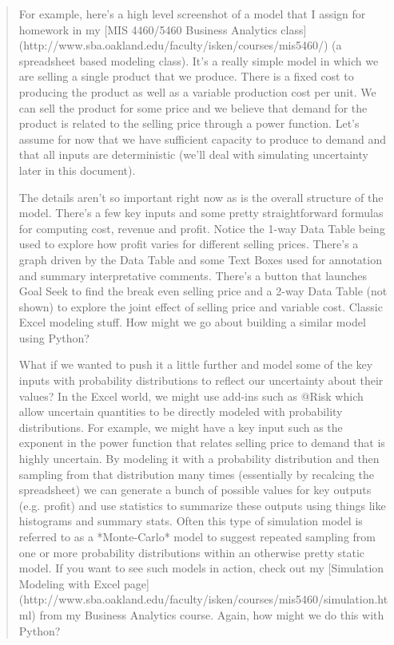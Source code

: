 \documentclass[ited,blindrev]{informs3}              %
\begin{document}
\begin{quote}
	For example, here's a high level screenshot of a model that I assign for homework in my [MIS 4460/5460 Business Analytics class](http://www.sba.oakland.edu/faculty/isken/courses/mis5460/) (a spreadsheet based modeling class).
	It's a really simple model in which we are selling a single product that we produce. There is a fixed cost to producing the product as well as a variable production cost per unit. We can sell the product for some price and we believe that demand for the product is related to the selling price through a power function. Let's assume for now that we have sufficient capacity to produce to demand and that all inputs are deterministic (we'll deal with simulating uncertainty later in this document).
	
	The details aren't so important right now as is the overall structure of the model. There's a few key inputs and some pretty straightforward formulas for computing cost, revenue and profit. Notice the 1-way Data Table being used to explore how profit varies for different selling prices. There's a graph driven by the Data Table and some Text Boxes used for annotation and summary interpretative comments. There's a button that launches Goal Seek to find the break even selling price and a 2-way Data Table (not shown) to explore the joint effect of selling price and variable cost. Classic Excel modeling stuff. How might we go about building a similar model using Python?  
	
	What if we wanted to push it a little further and model some of the key inputs with probability distributions to reflect our uncertainty about their values? In the Excel world, we might use add-ins such as @Risk which allow uncertain quantities to be directly modeled with probability distributions. For example, we might have a key input such as the exponent in the power function that relates selling price to demand that is highly uncertain. By modeling it with a probability distribution and then sampling from that distribution many times (essentially by recalcing the spreadsheet) we can generate a bunch of possible values for key outputs (e.g. profit) and use statistics to summarize these outputs using things like histograms and summary stats. Often this type of simulation model is referred to as a *Monte-Carlo* model to suggest repeated sampling from one or more probability distributions within an otherwise pretty static model. If you want to see such models in action, check out my [Simulation Modeling with Excel page](http://www.sba.oakland.edu/faculty/isken/courses/mis5460/simulation.html) from my Business Analytics course. Again, how might we do this with Python?
\end{quote}
\end{document}
